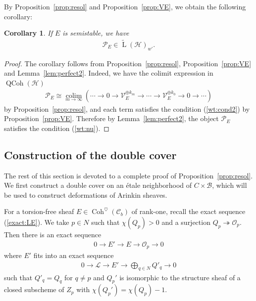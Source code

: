 \documentclass[11pt,oneside,a4paper,mathscr]{amsart}
\newtheorem{cor}[thm]{Corollary}
\theoremstyle{definition}
\newcommand{\LL}{\operatorname{L}}
\newcommand{\QCoh}{\operatorname{QCoh}}
\newcommand{\cH}{\mathcal{H}}
\newcommand{\cL}{\mathcal{L}}
\newcommand{\cB}{\mathcal{B}}
\newcommand{\cC}{\mathcal{C}}
\newcommand{\cP}{\mathcal{P}}
\newcommand{\cO}{\mathcal{O}}
\newcommand{\Coh}{\operatorname{Coh}}
\begin{document}
By Proposition~\ref{prop:resol} and Proposition~\ref{prop:VE}, we obtain the following corollary: 
\begin{cor}\label{cor:PE}
    If $E$ is semistable, we have 
    \begin{align*}
        \cP_E \in \widetilde{\LL}(\cH)_{w'}.
    \end{align*}
\end{cor}
\begin{proof}
The corollary follows from 
Proposition~\ref{prop:resol}, Proposition~\ref{prop:VE} and Lemma~\ref{lem:perfect2}.
Indeed, we have the colimit expression in $\QCoh(\cH)$
\begin{align*}
    \cP_E \cong \operatorname*{colim}_{m\to\infty}(\cdots \to 0 \to \mathcal{V}_E^{\oplus k_m} \to \cdots \to 
    \mathcal{V}_E^{\oplus k_0} \to 0 \to \cdots)
\end{align*}
by Proposition~\ref{prop:resol}, and each term satisfies the condition (\ref{wt:cond2})
by Proposition~\ref{prop:VE}. Therefore by Lemma~\ref{lem:perfect2}, 
the object $\cP_E$ satisfies the condition (\ref{wt:nu}). 
\end{proof}



\subsection{Construction of the double cover}\label{subsec:proof}
The rest of this section is devoted to a complete proof of Proposition~\ref{prop:resol}.
We first construct a double cover on an \'etale neighborhood of $C\times \cB$, 
which will be used to construct deformations of Arinkin sheaves. 

For a torsion-free sheaf $E\in \Coh^{\heartsuit}(\cC_b)$ of 
rank-one, recall the exact sequence (\ref{exact:LE}). 
We take $p\in N$ such that $\chi(Q_p)>0$ and a surjection 
$Q_p \twoheadrightarrow \cO_p$.
Then there is an exact sequence 
\begin{align}\label{exact:E1}
    0\to E' \to E \to \cO_p \to 0
\end{align}
where $E'$ fits into an exact sequence 
\begin{align}\label{exact:E2}
    0\to \cL \to E' \to \bigoplus_{q\in N}Q'_q\to 0
\end{align}
such that $Q'_q=Q_q$ for $q\neq p$
and $Q_p'$ is isomorphic to the structure 
sheaf of a closed subscheme of $Z_p$ with $\chi(Q_p')=\chi(Q_p)-1$.
\end{document}
